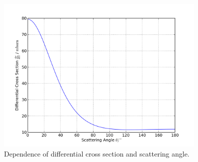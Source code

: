 \begin{figure}[tbp]
  \centering
  \includegraphics[width=0.9\textwidth]{plots/kleinn.png}
  \caption{Dependence of differential cross section and scattering angle.}
  \label{fig:kleinn}
\end{figure}
